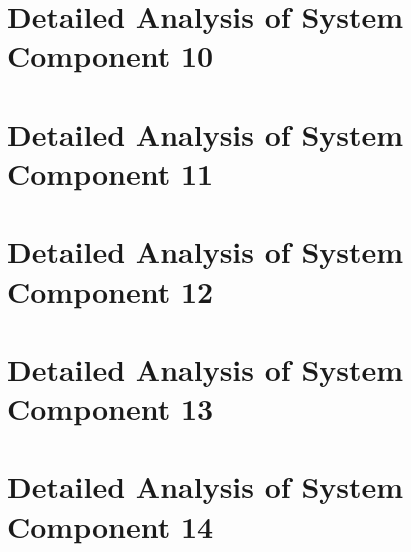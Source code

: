 \documentclass[10pt,journal,compsoc]{IEEEtran}
\begin{document}
\section{Detailed Analysis of System Component 10}
\lipsum[50-60]

\section{Detailed Analysis of System Component 11}
\lipsum[55-65]

\section{Detailed Analysis of System Component 12}
\lipsum[60-70]

\section{Detailed Analysis of System Component 13}
\lipsum[65-75]

\section{Detailed Analysis of System Component 14}
\lipsum[70-80]
\end{document}
